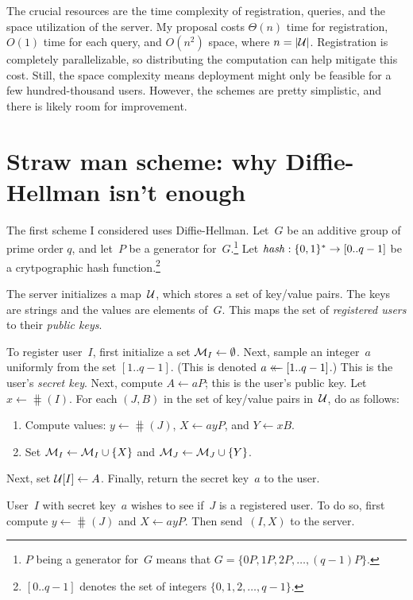 \documentclass{build/llncs}
\begin{document}
The crucial resources are the time complexity of registration, queries, and the
space utilization of the server.
%
My proposal costs $\Theta(n)$ time for registration, $O(1)$ time for each query,
and $O(n^2)$ space, where $n=|\mathcal{U}|$.
%
Registration is completely parallelizable, so distributing the computation can
help mitigate this cost.
%
Still, the space complexity means deployment might only be feasible for a few
hundred-thousand users. However, the schemes are pretty simplistic, and there
is likely room for improvement.

\section*{Straw man scheme: why Diffie-Hellman isn't enough}

The first scheme I considered uses Diffie-Hellman.
%
Let~$G$ be an additive group of prime order $q$, and let~$P$ be a generator
for~$G$.\footnote{$P$ being a generator for~$G$ means that $G = \{ 0P, 1P, 2P,
\ldots, (q-1)P \}$.}
%
Let $\mathit{hash}:\{0,1\}^* \to [0..q-1]$ be a crytpographic hash
function.\footnote{$[0..q-1]$ denotes the set of integers $\{0, 1, 2, \ldots,
q-1\}$.}

The server initializes a map~$\mathcal{U}$, which stores a set of key/value pairs. The
keys are strings and the values are elements of~$G$. This maps the set of
\emph{registered users} to their \emph{public keys}.

%
To register user~$I$, first initialize a set $\mathcal{M}_I \gets \emptyset$.
%
Next, sample an integer~$a$ uniformly from the set
$[1..q-1]$. (This is denoted $a \mathrel{\leftarrow\mkern-14mu\leftarrow} [1..q-1]$.) This is the user's
\emph{secret
key}.
%
Next, compute $A \gets aP$; this is the user's public key.
%
Let $x \gets \hash(I)$.
%
For each $(J, B)$ in the set of key/value pairs in~$\mathcal{U}$, do as follows:
\begin{enumerate}
  \item Compute values: $y \gets \hash(J)$, $X \gets ay P$, and $Y \gets x B$.
  \item Set $\mathcal{M}_I \gets \mathcal{M}_I \cup \{X\}$ and $\mathcal{M}_J \gets \mathcal{M}_J \cup \{Y\}$.
\end{enumerate}
Next, set $\mathcal{U}[I] \gets A$.
Finally, return the secret key~$a$ to the user.

%
User~$I$ with secret key~$a$ wishes to see if~$J$ is a registered user. To do
so, first compute $y \gets \hash(J)$ and $X \gets ay P$.
%
Then send~$(I, X)$ to the server.
\end{document}
